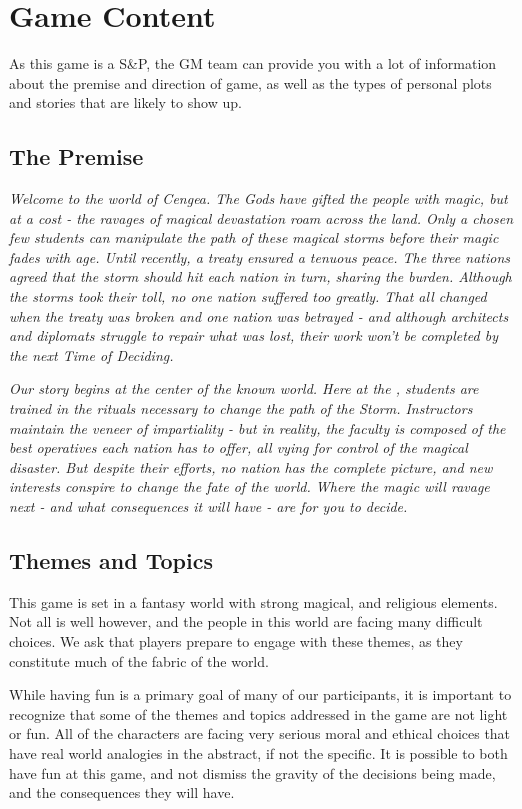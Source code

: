 \documentclass[sheet]{GL2020}
\begin{document}
\section{Game Content}
As this game is a S\&P, the GM team can provide you with a lot of information about the premise and direction of game, as well as the types of personal plots and stories that are likely to show up.

\subsection{The Premise}
\emph{Welcome to the world of Cengea. The Gods have gifted the people with magic, but at a cost - the ravages of magical devastation roam across the land. Only a chosen few students can manipulate the path of these magical storms before their magic fades with age. Until recently, a treaty ensured a tenuous peace. The three nations agreed that the storm should hit each nation in turn, sharing the burden. Although the storms took their toll, no one nation suffered too greatly. That all changed when the treaty was broken and one nation was betrayed - and although architects and diplomats struggle to repair what was lost, their work won’t be completed by the next Time of Deciding.}

\emph{Our story begins at the center of the known world. Here at the \pSchool{}, students are trained in the rituals necessary to change the path of the Storm. Instructors maintain the veneer of impartiality - but in reality, the faculty is composed of the best operatives each nation has to offer, all vying for control of the magical disaster. But despite their efforts, no nation has the complete picture, and new interests conspire to change the fate of the world. Where the magic will ravage next - and what consequences it will have - are for you to decide.}

\subsection{Themes and Topics}
This game is set in a fantasy world with strong magical, and religious elements. Not all is well however, and the people in this world are facing many difficult choices. We ask that players prepare to engage with these themes, as they constitute much of the fabric of the world.

While having fun is a primary goal of many of our participants, it is important to recognize that some of the themes and topics addressed in the game are not light or fun. All of the characters are facing very serious moral and ethical choices that have real world analogies in the abstract, if not the specific. It is possible to both have fun at this game, and not dismiss the gravity of the decisions being made, and the consequences they will have.
\end{document}
